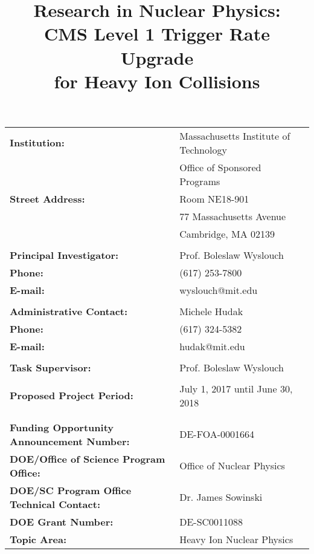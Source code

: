\begin{titlepage}
\vspace{2.2 cm}
\title{\textbf{Research in Nuclear Physics:\\
CMS Level 1 Trigger Rate Upgrade\\ for Heavy Ion Collisions}}

\vspace{.2 cm} 

\begin{center}
\begin{tabular}{ll}
 
\textbf{Institution:}                & Massachusetts Institute of Technology \\
                                     & Office of Sponsored Programs\\
\textbf{Street Address:} &	Room NE18-901 \\
				& 77 Massachusetts Avenue \\
				&	Cambridge, MA 02139 \\
& \\
\textbf{Principal Investigator:} & 	Prof. Boleslaw Wyslouch \\
\textbf{Phone:} & 			(617) 253-7800 \\
\textbf{E-mail:} & 			wyslouch@mit.edu \\
& \\
\textbf{Administrative Contact:} &	Michele Hudak \\
\textbf{Phone:} & 			(617) 324-5382 \\
\textbf{E-mail:} & 			hudak@mit.edu \\
& \\
\textbf{Task Supervisor:} &		Prof. Boleslaw Wyslouch \\
& \\
\textbf{Proposed Project Period:} &	July 1, 2017 until June 30, 2018 \\
&\\
& \\
\textbf{Funding Opportunity Announcement Number:} & 	DE-FOA-0001664 \\
\textbf{DOE/Office of Science Program Office:} & 		Office of Nuclear Physics \\ 
\textbf{DOE/SC Program Office Technical Contact:} & 	Dr. James Sowinski \\
\textbf{DOE Grant Number:} &				DE-SC0011088 \\
\textbf{Topic Area:	} &					Heavy Ion Nuclear Physics \\

\end{tabular}
\end{center}



\end{titlepage}





